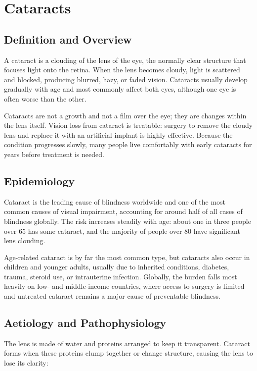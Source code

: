 \chapter{Cataracts}

\section*{Definition and Overview}
A cataract is a clouding of the lens of the eye, the normally clear structure that focuses light onto the retina. When the lens becomes cloudy, light is scattered and blocked, producing blurred, hazy, or faded vision. Cataracts usually develop gradually with age and most commonly affect both eyes, although one eye is often worse than the other.

Cataracts are not a growth and not a film over the eye; they are changes within the lens itself. Vision loss from cataract is treatable: surgery to remove the cloudy lens and replace it with an artificial implant is highly effective. Because the condition progresses slowly, many people live comfortably with early cataracts for years before treatment is needed.

\section*{Epidemiology}
Cataract is the leading cause of blindness worldwide and one of the most common causes of visual impairment, accounting for around half of all cases of blindness globally. The risk increases steadily with age: about one in three people over 65 has some cataract, and the majority of people over 80 have significant lens clouding.

Age-related cataract is by far the most common type, but cataracts also occur in children and younger adults, usually due to inherited conditions, diabetes, trauma, steroid use, or intrauterine infection. Globally, the burden falls most heavily on low- and middle-income countries, where access to surgery is limited and untreated cataract remains a major cause of preventable blindness.

\section*{Aetiology and Pathophysiology}
The lens is made of water and proteins arranged to keep it transparent. Cataract forms when these proteins clump together or change structure, causing the lens to lose its clarity:

